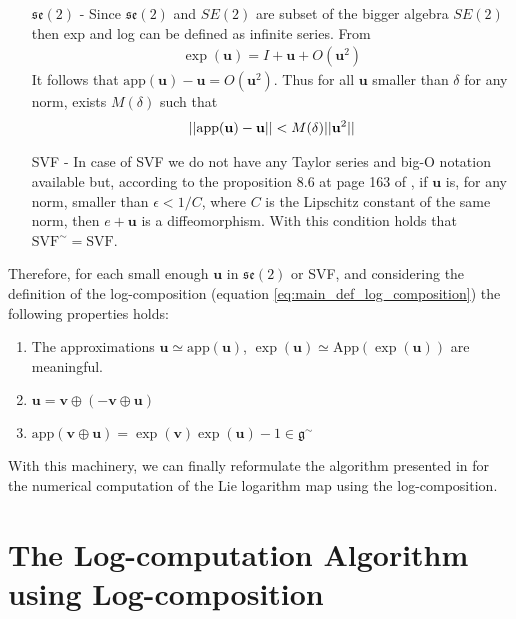 \begin{enumerate}
	\item[$\mathfrak{se}(2)$ -] Since $\mathfrak{se}(2)$ and $SE(2)$ are subset of the bigger algebra $SE(2)$ then exp and log can be defined as infinite series. From 
	\begin{align*}
	\exp(\mathbf{u}) = I + \mathbf{u} + O(\mathbf{u}^2) 
	\end{align*}
	It follows that $\text{app}(\mathbf{u}) - \mathbf{u} = O(\mathbf{u}^2)$. Thus for all $\mathbf{u}$ smaller than $\delta$ for any norm, exists $M(\delta)$ such that
	\begin{align*}
	\vert\lvert \text{app}(\mathbf{u}) - \mathbf{u}  \rvert\vert < M(\delta) \vert\lvert \mathbf{u}^2 \rvert\vert
	\end{align*}
	\item[SVF -] In case of SVF we do not have any Taylor series and big-O notation available but, according to the proposition 8.6 at page 163 of \cite{younes2010shapes}, if $\mathbf{u}$ is, for any norm, smaller than $\epsilon<1/C$, where $C$ is the Lipschitz constant of the same norm, then $e + \mathbf{u}$ is a diffeomorphism. With this condition holds that
	$\text{SVF}^{\sim} = \text{SVF}$. 
\end{enumerate}

\noindent
Therefore, for each small enough $\mathbf{u}$ in $\mathfrak{se}(2)$ or SVF, 
and considering the definition of the log-composition (equation \ref{eq:main_def_log_composition}) 
the following properties holds:
\begin{enumerate}
	\item The approximations $\mathbf{u} \simeq   \text{app} (\mathbf{u})$, $\exp(\mathbf{u}) \simeq   \text{App} (\exp(\mathbf{u})) $ are meaningful.
	\item $\mathbf{u} = \mathbf{v} \oplus (-\mathbf{v} \oplus  \mathbf{u} )$
	\item $\text{app} (\mathbf{v} \oplus  \mathbf{u}) = \exp(\mathbf{v})\exp(\mathbf{u}) - 1 \in \mathfrak{g} ^{\sim}$
\end{enumerate}

\noindent
With this machinery, we can finally reformulate the algorithm presented in \cite{Bossa:08} for the numerical computation of the Lie logarithm map using the log-composition.

\section{The Log-computation Algorithm using Log-composition}

